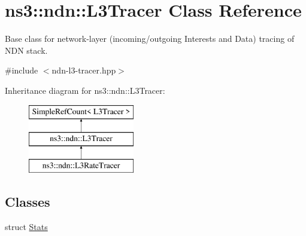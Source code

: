 \hypertarget{classns3_1_1ndn_1_1L3Tracer}{}\section{ns3\+:\+:ndn\+:\+:L3\+Tracer Class Reference}
\label{classns3_1_1ndn_1_1L3Tracer}


Base class for network-\/layer (incoming/outgoing Interests and Data) tracing of N\+DN stack.  




{\ttfamily \#include $<$ndn-\/l3-\/tracer.\+hpp$>$}

Inheritance diagram for ns3\+:\+:ndn\+:\+:L3\+Tracer\+:\begin{figure}[H]
\begin{center}
\leavevmode
\includegraphics[height=3.000000cm]{classns3_1_1ndn_1_1L3Tracer}
\end{center}
\end{figure}
\subsection*{Classes}
\begin{DoxyCompactItemize}
\item 
struct \hyperlink{structns3_1_1ndn_1_1L3Tracer_1_1Stats}{Stats}
\end{DoxyCompactItemize}

